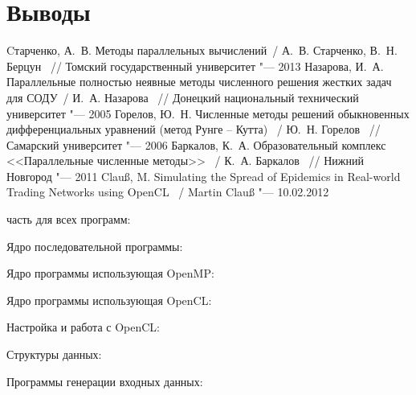 \documentclass[14pt,final,titlepage,pscyr]{hedwork}
\begin{document}
\newpage

\section{Выводы}

\newpage

\renewcommand{\bibname}{Список используемой литературы}
\begin{thebibliography}{10}
	 Cтарченко, А.~В. Методы параллельных вычислений~/ А.~В. Старченко, В.~Н. Берцун ~// 
		Томский государственный университет "--- 2013
	 Назарова, И.~А. Параллельные полностью неявные методы численного решения жестких 
		задач для СОДУ~/ И.~А. Назарова ~// Донецкий национальный технический университет "--- 2005
	 Горелов, Ю.~Н. Численные методы решений обыкновенных дифференциальных уравнений 
		(метод Рунге -- Кутта) ~/ Ю.~Н. Горелов ~// Самарский университет "--- 2006
	 Баркалов, К.~А. Образовательный комплекс <<Параллельные численные методы>> ~/ 
		К.~А. Баркалов ~// Нижний Новгород "--- 2011
	 Clauß, M. Simulating the Spread of Epidemics in Real-world Trading Networks 
		using OpenCL ~/ Martin Clauß "--- 10.02.2012
\end{thebibliography}

\newpage

\label{sec:app}
 часть для всех программ:


\newpage

Ядро последовательной программы:


\newpage

Ядро программы использующая OpenMP:


\newpage

Ядро программы использующая OpenCL:


Настройка и работа с OpenCL:


Структуры данных:




Программы генерации входных данных:



\end{document}

